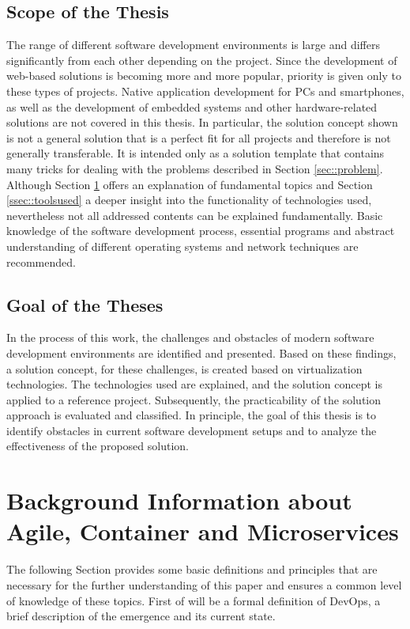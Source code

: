 \documentclass[12pt, a4paper]{article}
\begin{document}
    \subsection{Scope of the Thesis}
    The range of different software development environments is large and differs significantly from each other depending on the project. Since the development of web-based solutions is becoming more and more popular, priority is given only to these types of projects. Native application development for PCs and smartphones, as well as the development of embedded systems and other hardware-related solutions are not covered in this thesis.\newline
    In particular, the solution concept shown is not a general solution that is a perfect fit for all projects and therefore is not generally transferable. It is intended only as a solution template that contains many tricks for dealing with the problems described in Section \ref{sec::problem}. Although Section \ref{sec::backgrund} offers an explanation of fundamental topics and Section \ref{ssec::toolsused} a deeper insight into the functionality of technologies used, nevertheless not all addressed contents can be explained fundamentally. Basic knowledge of the software development process, essential programs and abstract understanding of different operating systems and network techniques are recommended.

    \subsection{Goal of the Theses}
    In the process of this work, the challenges and obstacles of modern software development environments are identified and presented. Based on these findings, a solution concept, for these challenges, is created based on virtualization technologies. The technologies used are explained, and the solution concept is applied to a reference project. Subsequently, the practicability of the solution approach is evaluated and classified. In principle, the goal of this thesis is to identify obstacles in current software development setups and to analyze the effectiveness of the proposed solution.\newpage

\section{Background Information about Agile, Container and Microservices}\label{sec::backgrund}
The following Section provides some basic definitions and principles that are necessary for the further understanding of this paper and ensures a common level of knowledge of these topics.\newline
First of will be a formal definition of DevOps, a brief description of the emergence and its current state.
\end{document}
